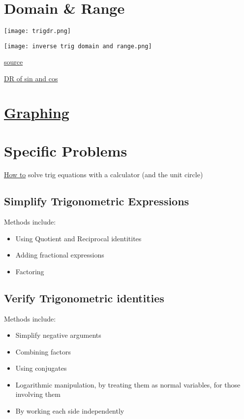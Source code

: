 \documentclass[openany]{book}
\begin{document}
\section{Domain \& Range}

\texttt{[image: trigdr.png]}

\texttt{[image: inverse trig domain and range.png]}

\href{https://en.wikipedia.org/wiki/Trigonometric_functions}{source}

\href{https://www.youtube.com/watch?v=Vw-RwPBWS8g&t=13s}{DR of sin and cos}

\section{\href{https://www.youtube.com/watch?v=fo_q9mEAFp4&t=2472s}{Graphing}}

\section{Specific Problems}

\href{https://www.youtube.com/watch?v=igkTyHWXx7Y}{How to} solve trig equations with a calculator (and the unit circle)


\subsection{Simplify Trigonometric Expressions}

Methods include:
\begin{itemize}
	\item Using Quotient and Reciprocal identitites
	\item Adding fractional expressions
	\item Factoring
\end{itemize}

\subsection{Verify Trigonometric identities}

Methods include:
\begin{itemize}
	\item Simplify negative arguments
	\item Combining factors
	\item Using conjugates
	\item Logarithmic manipulation, by treating them as normal variables, for those involving them
	\item By working each side independently
\end{itemize}
\end{document}

